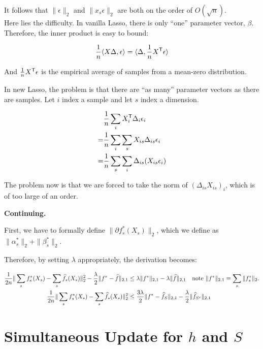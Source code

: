 \documentclass{article}
\begin{document}
It follows that $\| \epsilon \|_2$ and $\| x_s \epsilon \|_2$ are both on the order of $O(\sqrt{n})$.\\

Here lies the difficulty. In vanilla Lasso, there is only ``one'' parameter vector, $\beta$. Therefore, the inner product is easy to bound:

\begin{align*}
\frac{1}{n} \langle X \Delta, \epsilon \rangle = \langle \Delta, \frac{1}{n}X^{\mathsf{T}} \epsilon \rangle
\end{align*}

And $\frac{1}{ n} X^{\mathsf{T}} \epsilon$ is the empirical average of samples from a mean-zero distribution.

In new Lasso, the problem is that there are ``as many'' parameter vectors as there are samples. Let $i$ index a sample and let $s$ index a dimension.

\begin{align*}
& \frac{1}{n} \sum_i X_i^{\mathsf{T}} \Delta_i \epsilon_i \\
=& \frac{1}{n} \sum_i \sum_s X_{is} \Delta_{is} \epsilon_i \\
=& \frac{1}{n} \sum_s \sum_i \Delta_{is} ( X_{is} \epsilon_i )
\end{align*}

The problem now is that we are forced to take the norm of $( \Delta_{is} X_{is} )_i$, which is of too large of an order.

\textbf{Continuing.} 

First, we have to formally define $\| \partial f_s^*(X_s) \|_2$, which we define as $\| \alpha^*_s \|_2 + \| \beta^*_s\|_2$. 

Therefore, by setting $\lambda$ appropriately, the derivation becomes:

\begin{align*}
 \frac{1}{2n} \| \sum_s f^*_s(X_s) - \sum_s \widehat{f}_s(X_s) \|_2^2 - \frac{\lambda}{2} \| f^* - \widehat{f} \|_{2,1}  &\leq \lambda \|f^*\|_{2,1} - \lambda  \| \widehat{f} \|_{2,1}  \quad \textrm{note $\|f^* \|_{2,1} \equiv \sum_s \| f^*_s \|_2$.}\\
\frac{1}{2n} \| \sum_s f^*_s(X_s) - \sum_s \widehat{f}_s(X_s) \|_2^2 &\leq \frac{3\lambda}{2} \| f^* - \widehat{f}_S \|_{2,1} - \frac{\lambda}{2} \| \widehat{f}_{S^c} \|_{2,1}
\end{align*}




\section{Simultaneous Update for $h$ and $S$}
\end{document}
